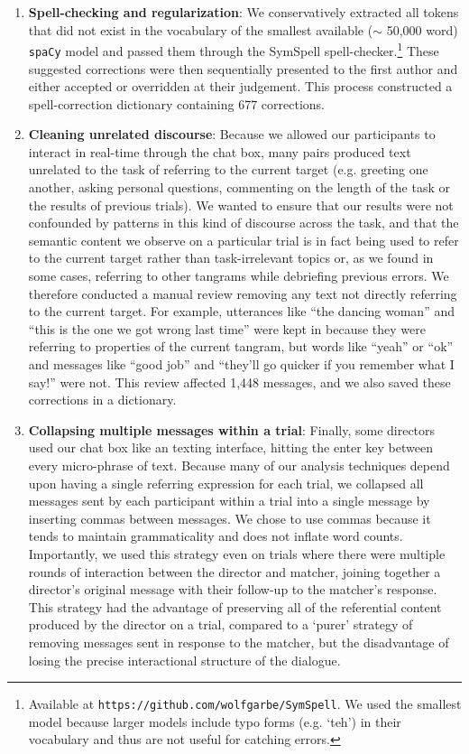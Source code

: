 \documentclass[alpha-refs]{wiley-article}
\begin{document}
\begin{enumerate}

\item \textbf{Spell-checking and regularization}: We conservatively extracted all tokens that did not exist in the vocabulary of the smallest available ($\sim$ 50,000 word) \texttt{spaCy} model and passed them through the SymSpell spell-checker.\footnote{Available at \texttt{https://github.com/wolfgarbe/SymSpell}. We used the smallest model because larger models include typo forms (e.g. `teh') in their vocabulary and thus are not useful for catching errors.} These suggested corrections were then sequentially presented to the first author and either accepted or overridden at their judgement. This process constructed a spell-correction dictionary containing 677 corrections.

\item \textbf{Cleaning unrelated discourse}: Because we allowed our participants to interact in real-time through the chat box, many pairs produced text unrelated to the task of referring to the current target (e.g. greeting one another, asking personal questions, commenting on the length of the task or the results of previous trials). We wanted to ensure that our results were not confounded by patterns in this kind of discourse across the task, and that the semantic content we observe on a particular trial is in fact being used to refer to the current target rather than task-irrelevant topics or, as we found in some cases, referring to other tangrams while debriefing previous errors. We therefore conducted a manual review removing any text not directly referring to the current target. For example, utterances like ``the dancing woman'' and ``this is the one we got wrong last time'' were kept in because they were referring to properties of the current tangram, but words like ``yeah'' or ``ok'' and messages like ``good job'' and ``they'll go quicker if you remember what I say!'' were not. This review affected 1,448 messages, and we also saved these corrections in a dictionary.

\item \textbf{Collapsing multiple messages within a trial}: Finally, some directors used our chat box like an texting interface, hitting the enter key between every micro-phrase of text. Because many of our analysis techniques depend upon having a single referring expression for each trial, we collapsed all messages sent by each participant within a trial into a single message by inserting commas between messages. We chose to use commas because it tends to maintain grammaticality and does not inflate word counts. Importantly, we used this strategy even on trials where there were multiple rounds of interaction between the director and matcher, joining together a director's original message with their follow-up to the matcher's response. This strategy had the advantage of preserving all of the referential content produced by the director on a trial, compared to a `purer' strategy of removing messages sent in response to the matcher, but the disadvantage of losing the precise interactional structure of the dialogue. 


\end{enumerate}
\end{document}

